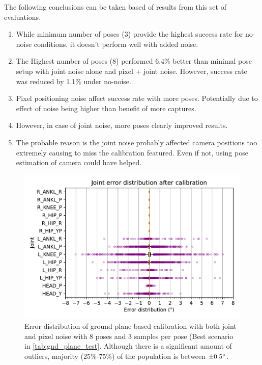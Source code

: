 \documentclass[english, printversion, nomenclature, notitle]{tuvisionthesis} %
\begin{document}
The following conclusions can be taken based of results from this set of evaluations.
\begin{enumerate}
\item 
While minimum number of poses (3) provide the highest success rate for no-noise conditions, it doesn't perform well with added noise.
\item 
The Highest number of poses (8) performed 6.4\% better than minimal pose setup with joint noise alone and pixel + joint noise. However, success rate was reduced by 1.1\% under no-noise.
\item
Pixel positioning noise affect success rate with more poses. Potentially due to effect of noise being higher than benefit of more captures.
\item
However, in case of joint noise, more poses clearly improved results. 
\item The probable reason is the joint noise probably affected camera positions too extremely causing to miss the calibration featured. Even if not, using pose estimation of camera could have helped.
\end{enumerate}

\begin{center}
	\begin{figure}
		\includegraphics[width=\columnwidth]{both_n_gnd.pdf}
		\caption[Error distribition of ground plane based calibration]{Error distribution of ground plane based calibration with both joint and pixel noise with 8 poses and 3 samples per pose (Best scenario in \cref{tab:gnd_plane_test}. Although there is a significant amount of outliers, majority (25\%-75\%) of the population is between $\pm 0.5\degree$.}
		\label{fig:calib_gnd}
	\end{figure}
\end{center}
\end{document}
